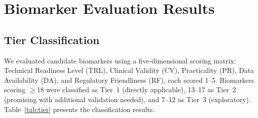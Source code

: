 \documentclass[conference]{IEEEtran}
\begin{document}
\section{Biomarker Evaluation Results}

\subsection{Tier Classification}

We evaluated candidate biomarkers using a five-dimensional scoring matrix: Technical Readiness Level (TRL), Clinical Validity (CV), Practicality (PR), Data Availability (DA), and Regulatory Friendliness (RF), each scored 1--5. Biomarkers scoring $\geq$18 were classified as Tier~1 (directly applicable), 13--17 as Tier~2 (promising with additional validation needed), and 7--12 as Tier~3 (exploratory). Table~\ref{tab:tier} presents the classification results.
\end{document}
